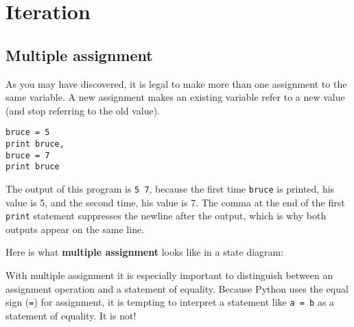 

\chapter{Iteration}


\section{Multiple assignment}

As you may have discovered, it is legal to
make more than one assignment to the same variable.  A
new assignment makes an existing variable refer to a new
value (and stop referring to the old value).

\beforeverb
\begin{verbatim}
bruce = 5
print bruce,
bruce = 7
print bruce
\end{verbatim}
\afterverb
%
The output of this program is {\tt 5 7}, because the first time
{\tt bruce} is printed, his value is 5, and the second time, his
value is 7.  The
comma at the end of the first {\tt print} statement suppresses
the newline after the output, which is why both outputs
appear on the same line.

Here is what {\bf multiple assignment} looks like in a state diagram:

\beforefig
\centerline{}
\afterfig

With multiple assignment it is especially important to distinguish
between an assignment operation and a statement of equality.  Because
Python uses the equal sign ({\tt =}) for assignment, it is tempting to
interpret a statement like {\tt a = b} as a statement of equality. It
is not!

